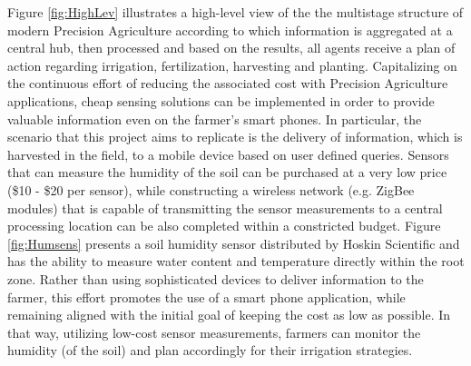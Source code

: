 \documentclass{article}
\begin{document}
\noindent Figure \ref{fig:HighLev} illustrates a high-level view of the the multistage structure of modern Precision Agriculture according to which information is aggregated at a central hub, then processed and based on the results, all agents receive a plan of action regarding irrigation, fertilization, harvesting and planting.  Capitalizing on the continuous effort of reducing the associated cost with Precision Agriculture applications, cheap sensing solutions can be implemented in order to provide valuable information even on the farmer's smart phones. In particular, the scenario that this project aims to replicate is the delivery of information, which is harvested in the field, to a mobile device based on user defined queries. Sensors that can measure the humidity of the soil can be purchased at a very low price (\$10 - \$20 per sensor), while constructing a wireless network
(e.g. ZigBee modules) that is capable of transmitting
the sensor measurements to a central processing location can be also completed within a constricted budget.
Figure \ref{fig:Humsens} presents a soil humidity sensor distributed by Hoskin Scientific and has the ability to measure water content and temperature directly within the root zone. Rather than using sophisticated devices to deliver information to the farmer, this effort promotes the use of a smart phone application, while remaining aligned with the initial goal of keeping the cost as low as possible. In that way, utilizing low-cost sensor measurements, farmers can monitor the humidity (of the soil) and plan accordingly for their irrigation strategies.
\end{document}
